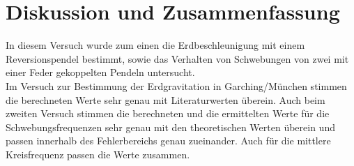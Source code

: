 \section{Diskussion und Zusammenfassung}
In diesem Versuch wurde zum einen die Erdbeschleunigung mit einem Reversionspendel bestimmt, sowie das Verhalten von Schwebungen von zwei mit einer Feder gekoppelten Pendeln untersucht.\\
Im Versuch zur Bestimmung der Erdgravitation in Garching/München stimmen die berechneten Werte sehr genau mit Literaturwerten überein. Auch beim zweiten Versuch stimmen die berechneten und die ermittelten Werte für die Schwebungsfrequenzen sehr genau mit den theoretischen Werten überein und passen innerhalb des Fehlerbereichs genau zueinander. Auch für die mittlere Kreisfrequenz passen die Werte zusammen.